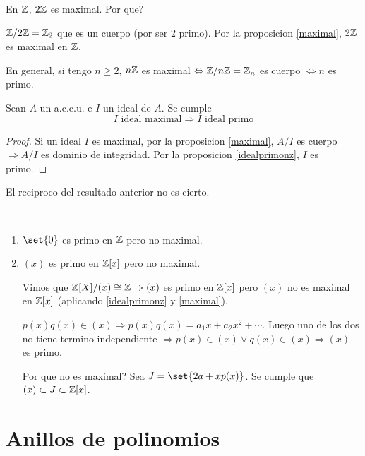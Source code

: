 \begin{example}
	En \(\mathbb{Z}\), \(2\mathbb{Z} \) es maximal. Por que?
	
	\(\mathbb{Z} / 2\mathbb{Z} = \mathbb{Z}_2 \) que es un cuerpo (por ser 2 primo). Por la proposicion \ref{maximal}, \(2\mathbb{Z} \) es maximal en \(\mathbb{Z} \).
	
	En general, si tengo \(n \geq 2 \), \(n\mathbb{Z} \) es maximal \(\Leftrightarrow \mathbb{Z} / n\mathbb{Z} = \mathbb{Z}_n\) es cuerpo \(\iff n \) es primo.
	
\end{example}
\begin{corollary}
	Sean \(A \) un a.c.c.u. e \(I \) un ideal de \(A \). Se cumple
	\[
		I \text{ ideal maximal} \Rightarrow I \text{ ideal primo}
	\]
\end{corollary}
\begin{proof}
	Si un ideal \(I \) es maximal, por la proposicion \ref{maximal}, \(A / I \) es cuerpo \(\Rightarrow A/ I \) es dominio de integridad. Por la proposicion \ref{idealprimonz}, \(I \) es primo.
\end{proof}
\begin{remark}
	El reciproco del resultado anterior no es cierto.
\end{remark}
\begin{example}
	~\begin{enumerate}
		\item \(\set{0 }\) es primo en \(\mathbb{Z} \) pero no maximal.
		\item \((x )\) es primo en \(\mathbb{Z}[x ]\) pero no maximal.
		      
		      Vimos que \(\mathbb{Z}[X] / (x ) \cong \mathbb{Z} \Rightarrow (x)\) es primo en \(\mathbb{Z}[x ]\) pero \((x )\) no es maximal en \(\mathbb{Z}[x ]\) (aplicando \ref{idealprimonz} y \ref{maximal}).
		      
		      \(p(x)q(x) \in (x) \Rightarrow p(x)q(x) = a_1 x + a_2 x^{2} + \cdots \). Luego uno de los dos no tiene termino independiente \(\Rightarrow p(x) \in (x) \vee q(x) \in (x)\Rightarrow (x) \) es primo.
		      
		      Por que no es maximal? Sea \(J = \set{2a + xp(x )}\). Se cumple que \((x) \subset J \subset \mathbb{Z}[x ]\).
	\end{enumerate}
\end{example}
\pagebreak
\section{Anillos de polinomios}
